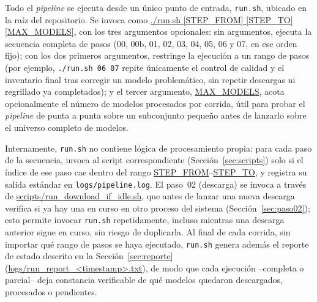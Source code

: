 \documentclass[11pt,a4paper]{article}
\newcommand{\archivo}[1]{\begingroup\hypersetup{urlcolor=black}\url{#1}\endgroup}
\begin{document}
Todo el \emph{pipeline} se ejecuta desde un \'unico punto de entrada, \texttt{run.sh}, ubicado en la ra\'iz del repositorio. Se invoca como \archivo{./run.sh [STEP_FROM] [STEP_TO] [MAX_MODELS]}, con los tres argumentos opcionales: sin argumentos, ejecuta la secuencia completa de pasos (00, 00b, 01, 02, 03, 04, 05, 06 y 07, en ese orden fijo); con los dos primeros argumentos, restringe la ejecuci\'on a un rango de pasos (por ejemplo, \texttt{./run.sh 06 07} repite \'unicamente el control de calidad y el inventario final tras corregir un modelo problem\'atico, sin repetir descargas ni regrillado ya completados); y el tercer argumento, \archivo{MAX_MODELS}, acota opcionalmente el n\'umero de modelos procesados por corrida, \'util para probar el \emph{pipeline} de punta a punta sobre un subconjunto peque\~no antes de lanzarlo sobre el universo completo de modelos.

Internamente, \texttt{run.sh} no contiene l\'ogica de procesamiento propia: para cada paso de la secuencia, invoca al script correspondiente (Secci\'on~\ref{sec:scripts}) solo si el \'indice de ese paso cae dentro del rango \archivo{STEP_FROM}--\archivo{STEP_TO}, y registra su salida est\'andar en \texttt{logs/pipeline.log}. El paso~02 (descarga) se invoca a trav\'es de \archivo{scripts/run_download_if_idle.sh}, que antes de lanzar una nueva descarga verifica si ya hay una en curso en otro proceso del sistema (Secci\'on~\ref{sec:paso02}); esto permite invocar \texttt{run.sh} repetidamente, incluso mientras una descarga anterior sigue en curso, sin riesgo de duplicarla. Al final de cada corrida, sin importar qu\'e rango de pasos se haya ejecutado, \texttt{run.sh} genera adem\'as el reporte de estado descrito en la Secci\'on~\ref{sec:reporte} (\archivo{logs/run_report_<timestamp>.txt}), de modo que cada ejecuci\'on --completa o parcial-- deja constancia verificable de qu\'e modelos quedaron descargados, procesados o pendientes.
\end{document}
